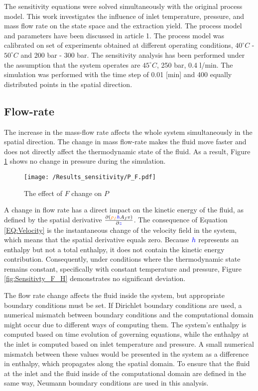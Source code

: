 \documentclass[../Article_Model_Parameters.tex]{subfiles}
\begin{document}
	
	\label{CH: Results}
	
	The sensitivity equations were solved simultaneously with the original process model. This work investigates the influence of inlet temperature, pressure, and mass flow rate on the state space and the extraction yield. The process model and parameters have been discussed in {\color{red}article 1}. The process model was calibrated on set of experiments obtained at different operating conditions, $40^\circ C$ - $50^\circ C$ and 200 bar - 300 bar. The sensitivity analysis has been performed under the assumption that the system operates are $45^\circ C$, 250 bar, 0.4 l/min. The simulation was performed with the time step of 0.01 [min] and 400 equally distributed points in the spatial direction.
	
	\subsection{Flow-rate}
	
	The increase in the mass-flow rate affects the whole system simultaneously in the spatial direction. The change in mass flow-rate makes the fluid move faster and does not directly affect the thermodynamic state of the fluid. As a result, Figure \ref{fig:Sensitivty_F_P} shows no change in pressure during the simulation. 
    
    \begin{figure}[h!]
    	\centering
    	\texttt{[image: /Results\_sensitivity/P\_F.pdf]}
    	\caption{The effect of $F$ change on $P$}
    	\label{fig:Sensitivty_F_P}
    \end{figure}
    
    A change in flow rate has a direct impact on the kinetic energy of the fluid, as defined by the spatial derivative $\frac{\partial \left( {\color{orange}\rho_f}{\color{blue}h} A_f v \right)}{\partial {\color{blue}z}}$. The consequence of Equation \ref{EQ:Velocity} is the instantaneous change of the velocity field in the system, which means that the spatial derivative equals zero. Because ${\color{blue}h}$ represents an enthalpy but not a total enthalpy, it does not contain the kinetic energy contribution. Consequently, under conditions where the thermodynamic state remains constant, specifically with constant temperature and pressure, Figure \ref{fig:Sensitivty_F_H} demonstrates no significant deviation.
    
    The flow rate change affects the fluid inside the system, but appropriate boundary conditions must be set. If Dirichlet boundary conditions are used, a numerical mismatch between boundary conditions and the computational domain might occur due to different ways of computing them. The system's enthalpy is computed based on time evolution of governing equations, while the enthalpy at the inlet is computed based on inlet temperature and pressure. A small numerical mismatch between these values would be presented in the system as a difference in enthalpy, which propagates along the spatial domain. To ensure that the fluid at the inlet and the fluid inside of the computational domain are defined in the same way, Neumann boundary conditions are used in this analysis.
        
\end{document}
